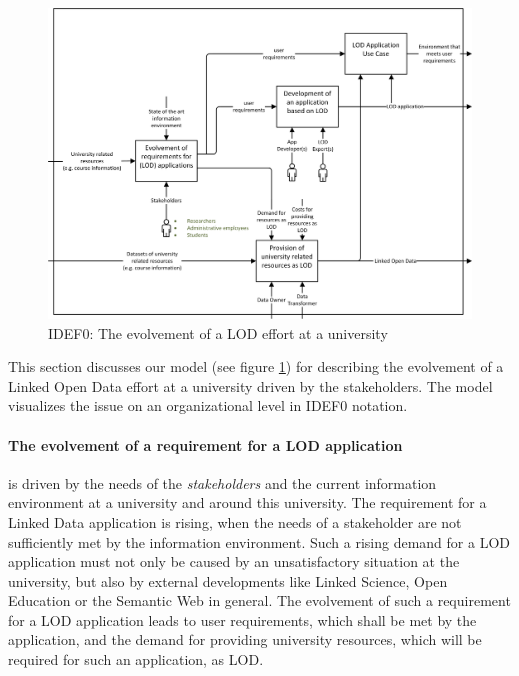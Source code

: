 \documentclass{article}
\begin{document}
\begin{figure}[t]
\centering \includegraphics*[width=1.0\columnwidth]{images/technical-architecture/lod_at_tuwien_idef0.png}
\caption{IDEF0: The evolvement of a LOD effort at a university}
\label{fig:tac-idef0}
\end{figure}

This section discusses our model (see figure \ref{fig:tac-idef0}) for describing the evolvement of a Linked Open Data effort at a university driven by the stakeholders. The model visualizes the issue on an organizational level in IDEF0 notation.

\paragraph{The evolvement of a requirement for a LOD application}
\label{technical-architecture-challenges:lod-effort:evolvement-app-requirement}
is driven by the needs of the \textit{stakeholders} and the current information environment at a university and around this university. The requirement for a Linked Data application is rising, when the needs of a stakeholder are not sufficiently met by the information environment. Such a rising demand for a LOD application must not only be caused by an unsatisfactory situation at the university, but also by external developments like Linked Science, Open Education or the Semantic Web in general. The evolvement of such a requirement for a LOD application leads to user requirements, which shall be met by the application, and the demand for providing university resources, which will be required for such an application, as LOD.
\end{document}
